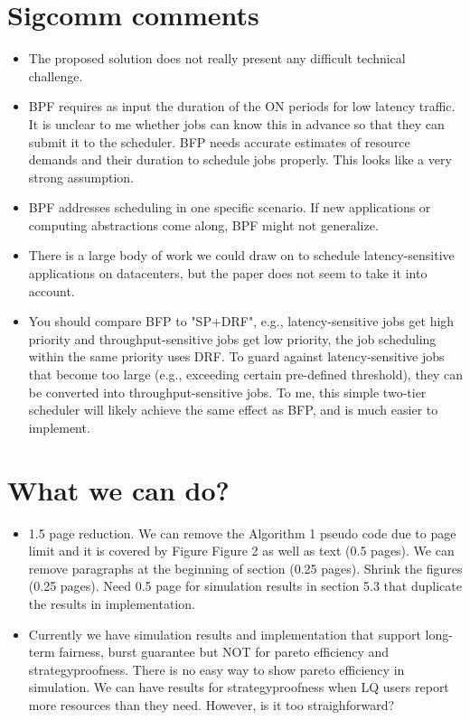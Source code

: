 \section{Sigcomm comments}

\begin{itemize}
	\item The proposed solution does not really present any difficult technical challenge. 
	\item BPF requires as input the duration of the ON periods for low latency traffic. It is unclear to me whether jobs can know this in advance so that they can submit it to the scheduler. BFP needs accurate estimates of resource demands and their duration to schedule jobs properly. This looks like a very strong assumption. 
	\item BPF addresses scheduling in one specific scenario.  If new applications or computing abstractions come along, BPF might not generalize.
	\item There is a large body of work we could draw on to schedule latency-sensitive applications on datacenters, but the paper does not seem to take it into account. 
	\item You should compare BFP to  "SP+DRF", e.g., latency-sensitive jobs get high priority and throughput-sensitive jobs get low priority, the job scheduling within the same priority uses DRF. To guard against latency-sensitive jobs that become too large (e.g., exceeding certain pre-defined threshold), they can be converted into throughput-sensitive jobs. To me, this simple two-tier scheduler will likely achieve the same effect as BFP, and is much easier to implement. 
\end{itemize}

\section{What we can do?}

\begin{itemize}
	\item 1.5 page reduction. We can remove the Algorithm 1 pseudo code due to page limit and it is covered by Figure Figure 2 as well as text (0.5 pages). We can remove paragraphs at the beginning of section (0.25 pages). Shrink the figures (0.25 pages). Need 0.5 page for simulation results in section 5.3 that duplicate the results in implementation.
	\item Currently we have simulation results and implementation that support long-term fairness, burst guarantee but NOT for pareto efficiency and strategyproofness. There is no easy way to show pareto efficiency in simulation. We can have results for strategyproofness when LQ users report more resources than they need. However, is it too straighforward?	
\end{itemize}